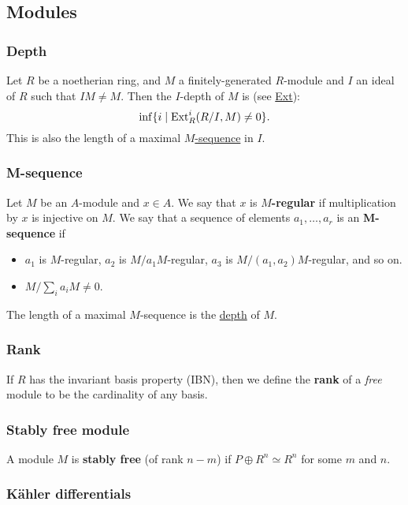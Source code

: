 \documentclass[11pt, english]{article}
\begin{document}
\subsection{Modules}
\subsubsection{Depth}
\label{depth}
Let $R$ be a noetherian ring, and $M$ a finitely-generated $R$-module and $I$ an ideal of $R$ such that $IM \neq M$. Then the $I$-depth of $M$ is (see \hyperref[ext]{Ext}): \[\inf\{i \mid \operatorname{\mathrm{Ext}}^i_R(R/I,M) \neq 0\}.\]
This is also the length of a maximal \hyperref[msequence]{$M$-sequence} in $I$.

\subsubsection{M-sequence}
\label{msequence}

Let $M$ be an $A$-module and $x \in A$. We say that $x$ is \textbf{$M$-regular} if multiplication by $x$ is injective on $M$. We say that a sequence of elements $a_1,\ldots,a_r$ is an \textbf{M-sequence} if 
\begin{itemize}
\item $a_1$ is $M$-regular, $a_2$ is $M/a_1M$-regular, $a_3$ is $M/(a_1,a_2)M$-regular, and so on.
\item $M/\sum_i a_i M \neq 0$.
\end{itemize}
The length of a maximal $M$-sequence is the \hyperref[depth]{depth} of $M$.

\subsubsection{Rank}
\label{lengthmodule}

If $R$ has the invariant basis property (IBN), then we define the \textbf{rank} of a \emph{free} module to be the cardinality of any basis.

\subsubsection{Stably free module}
\label{stablyfree}

A module $M$ is \textbf{stably free} (of rank $n-m$) if $P \oplus R^n \simeq R^n$ for some $m$ and $n$. 

\subsubsection{Kähler differentials}
\label{kahlerdifferentials}
\end{document}

